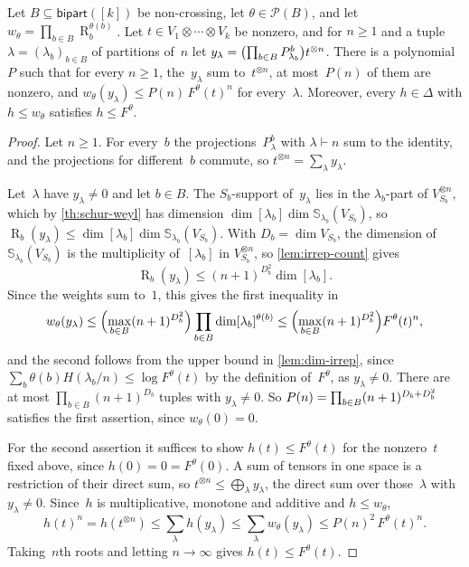 \documentclass[11pt,letterpaper]{article}
\DeclareMathOperator{\tensorrank}{R}
\newcommand{\bipart}{\mathsf{bipart}}
\begin{document}
\begin{lemma}\label{lem:dominated}
Let $B \subseteq \bipart([k])$ be non-crossing, let $\theta \in \mathcal{P}(B)$, and let $w_\theta = \prod_{b \in B} \tensorrank_b^{\theta(b)}$. Let $t \in V_1 \otimes \cdots \otimes V_k$ be nonzero, and for $n \geq 1$ and a tuple $\lambda = (\lambda_b)_{b \in B}$ of partitions of~$n$ let $y_\lambda = \bigl( \prod_{b \in B} P^b_{\smash{\lambda_b}} \bigr) t^{\otimes n}$. There is a polynomial~$P$ such that for every $n \geq 1$, the~$y_\lambda$ sum to~$t^{\otimes n}$, at most~$P(n)$ of them are nonzero, and $w_\theta(y_\lambda) \leq P(n)\, F^\theta(t)^n$ for every~$\lambda$. Moreover, every $h \in \Delta$ with $h \leq w_\theta$ satisfies $h \leq F^\theta$.
\end{lemma}
\begin{proof}
Let $n \geq 1$. For every~$b$ the projections~$P^b_{\lambda}$ with $\lambda \vdash n$ sum to the identity, and the projections for different~$b$ commute, so $t^{\otimes n} = \sum_\lambda y_\lambda$.

Let~$\lambda$ have $y_\lambda \neq 0$ and let $b \in B$. The $S_b$-support of~$y_\lambda$ lies in the $\lambda_b$-part of $V_{S_b}^{\otimes n}$, which by \cref{th:schur-weyl} has dimension $\dim[\lambda_b] \dim \mathbb{S}_{\lambda_b}(V_{S_b})$, so $\tensorrank_b(y_\lambda) \leq \dim[\lambda_b] \dim \mathbb{S}_{\lambda_b}(V_{S_b})$. With $D_b = \dim V_{S_b}$, the dimension of $\mathbb{S}_{\lambda_b}(V_{S_b})$ is the multiplicity of~$[\lambda_b]$ in $V_{S_b}^{\otimes n}$, so \cref{lem:irrep-count} gives
\[
\tensorrank_b(y_\lambda) \leq (n+1)^{D_b^2} \dim[\lambda_b].
\] Since the weights sum to~$1$, this gives the first inequality in
\[
w_\theta(y_\lambda) \leq \Bigl( \max_{b \in B} (n+1)^{D_b^2} \Bigr) \prod_{b \in B} \dim[\lambda_b]^{\theta(b)} \leq \Bigl( \max_{b \in B} (n+1)^{D_b^2} \Bigr) F^\theta(t)^n,
\]
and the second follows from the upper bound in \cref{lem:dim-irrep}, since $\sum_b \theta(b) H(\lambda_b/n) \leq \log F^\theta(t)$ by the definition of~$F^\theta$, as $y_\lambda \neq 0$. There are at most $\prod_{b \in B} (n+1)^{D_b}$ tuples with $y_\lambda \neq 0$. So $P(n) = \prod_{b \in B} (n+1)^{\smash{D_b + D_b^2}}$ satisfies the first assertion, since $w_\theta(0) = 0$.

For the second assertion it suffices to show $h(t) \leq F^\theta(t)$ for the nonzero~$t$ fixed above, since $h(0) = 0 = F^\theta(0)$. A sum of tensors in one space is a restriction of their direct sum, so $t^{\otimes n} \leq \bigoplus_\lambda y_\lambda$, the direct sum over those~$\lambda$ with $y_\lambda \neq 0$. Since~$h$ is multiplicative, monotone and additive and $h \leq w_\theta$,
\[
h(t)^n = h(t^{\otimes n}) \leq \sum_\lambda h(y_\lambda) \leq \sum_\lambda w_\theta(y_\lambda) \leq P(n)^2\, F^\theta(t)^n.
\]
Taking~$n$th roots and letting $n \to \infty$ gives $h(t) \leq F^\theta(t)$.
\end{proof}
\end{document}
